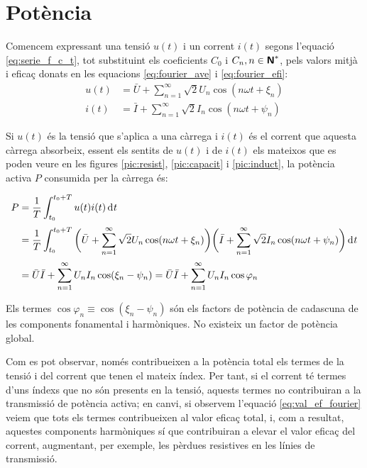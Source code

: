 \section{Potència}

Comencem expressant una tensió $u(t)$ i un corrent $i(t)$
 segons l'equació \eqref{eq:serie_f_c_t}, tot substituint els
 coeficients $C_0$ i $C_n, n \in {\ensuremath{\boldsymbol{\mathsf{N}}}}^*$, pels valors mitjà i eficaç
 donats en les equacions \eqref{eq:fourier_ave} i \eqref{eq:fourier_efi}:
 \begin{align}
    u(t)  &= \bar{U} + \sum_{n=1}^\infty \sqrt{2} U_n \cos (n \omega t +
    \xi_n)\\[0.5ex]
    i(t)  &= \bar{I} + \sum_{n=1}^\infty \sqrt{2} I_n \cos (n \omega t + \psi_n)
 \end{align}

Si  $u(t)$ és la tensió que s'aplica a una càrrega i $i(t)$ és el
corrent que aquesta càrrega absorbeix, essent els sentits de $u(t)$
i de $i(t)$ els mateixos que es poden veure en les figures
\ref{pic:resist}, \ref{pic:capacit} i \ref{pic:induct}, la potència
activa $P$ consumida per la càrrega és:

\begin{equation}\begin{split}
    P &= \frac{1}{T} \int_{t_0}^{t_0+T} u(t) i(t) \diff t 
    \\[0.5ex]
     &= \frac{1}{T} \int_{t_0}^{t_0+T} \bigg(\bar{U} + \sum_{n=1}^\infty
    \sqrt{2} U_n \cos (n \omega t + \xi_n) \bigg)
    \bigg(\bar{I} + \sum_{n=1}^\infty \sqrt{2} I_n
    \cos (n \omega t + \psi_n)\bigg) \diff t\\[0.5ex]
    &=\bar{U} \bar{I} + \sum_{n=1}^\infty U_n I_n
    \cos(\xi_n-\psi_n) = \bar{U} \bar{I} + \sum_{n=1}^\infty U_n I_n
    \cos \varphi_n \label{eq:pot_fu}
\end{split}\end{equation}

Els termes $\cos \varphi_n \equiv \cos (\xi_n-\psi_n)$ són els factors de
potència de cadascuna de les components fonamental i harmòniques. No
existeix un factor de potència global.

 Com es pot observar, només contribueixen a la potència
total els termes de la tensió i del corrent que tenen el mateix
índex. Per tant, si el corrent té termes d'uns índexs que no són
presents en la tensió, aquests termes no contribuiran a la
transmissió de  potència activa; en canvi, si observem l'equació
\eqref{eq:val_ef_fourier} veiem que tots els termes contribueixen al
valor eficaç total, i, com a resultat, aquestes components harmòniques sí que
contribuiran a elevar el valor eficaç del corrent, augmentant, per exemple, 
 les pèrdues resistives en les línies de transmissió.

